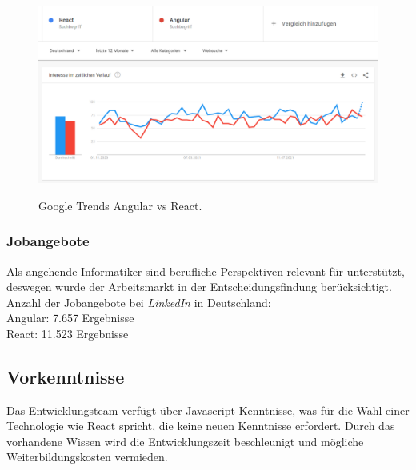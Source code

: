 \begin{figure}[h!]
  \centering
  \includegraphics[scale=0.5]{sources/GoogleTrends React Angular 1.11.2020 29.10.2021}
  \caption[Google Trends Angular vs React]{}
  \label{fig:GoogleTrends React Angular 1.11.2020 29.10.2021} 
  Google Trends Angular vs React{\cite{GO01}}.
\end{figure}

\subsubsection*{Jobangebote}
Als angehende Informatiker sind berufliche Perspektiven relevant für unterstützt, deswegen wurde der Arbeitsmarkt in der Entscheidungsfindung berücksichtigt.
\\
Anzahl der Jobangebote bei \textit{LinkedIn} in Deutschland:\\
Angular: 7.657 Ergebnisse{\cite{LI1}}\\
React: 11.523 Ergebnisse{\cite{LI2}}

\subsection{Vorkenntnisse}
Das Entwicklungsteam verfügt über Javascript-Kenntnisse, was für die Wahl einer Technologie wie React spricht, die keine neuen Kenntnisse erfordert. Durch das vorhandene Wissen wird die Entwicklungszeit beschleunigt und mögliche Weiterbildungskosten vermieden.

